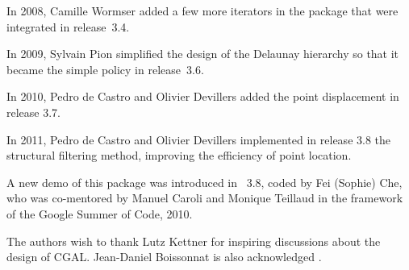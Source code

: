 In 2008, Camille Wormser added a few more iterators in
the package that were integrated in release~3.4.

In 2009, Sylvain Pion simplified the design of the Delaunay hierarchy
so that it became the simple  policy in release~3.6.

In 2010, Pedro de Castro and Olivier Devillers added the point
displacement in release 3.7.

In 2011,  Pedro de Castro and Olivier Devillers implemented in release
3.8 the
structural filtering method, improving the efficiency of point location.

A new demo of this package was introduced in \cgal\ 3.8, coded by Fei
(Sophie) Che, who was co-mentored by Manuel Caroli and Monique
Teillaud in the framework of the Google Summer of Code, 2010.

The authors wish to thank Lutz Kettner for inspiring discussions about
the design of CGAL. Jean-Daniel Boissonnat is also acknowledged
\cite{bdty-tcgal-00}.
